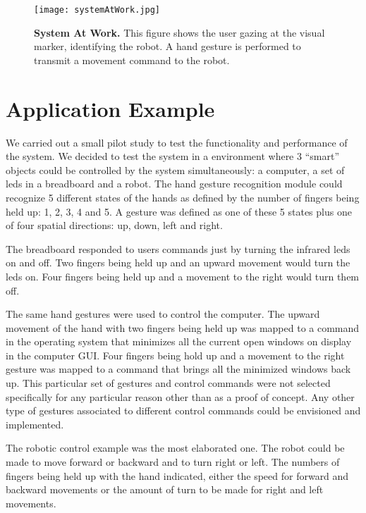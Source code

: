\documentclass[jou,a4paper,notxfonts]{apa}
\begin{document}
\begin{figure}[tp]
 \texttt{[image: systemAtWork.jpg]}
 \caption{\textbf{System At Work.} This figure shows the user gazing at the visual marker, identifying the robot. A hand gesture is performed to transmit a movement command to the robot.}
 \label{systemAtWork}
\end{figure}

\section{Application Example}
We carried out a small pilot study to test the functionality and performance of the system. We decided to test the
system in a environment where 3 ``smart'' objects could be controlled by the system simultaneously: a computer, a set of
leds in a breadboard and a robot. The hand gesture recognition module could recognize 5 different states of the hands
as defined by the number of fingers being held up: 1, 2, 3, 4 and 5. A gesture was defined as one of these 5 states plus
one of four spatial directions: up, down, left and right.

The breadboard responded to users commands just by turning the infrared leds on and off. Two fingers being held up and
an upward movement would turn the leds on. Four fingers being held up and a movement to the right would turn them off.

The same hand gestures were used to control the computer. The upward movement of the hand with two fingers being held up
was mapped to a command in the operating system that minimizes all the current open windows on display in the computer
GUI. Four fingers being hold up and a movement to the right gesture was mapped to a command that brings all the
minimized windows back up. This particular set of gestures and control commands were not selected specifically for
any particular reason other than as a proof of concept. Any other type of gestures associated to different
control commands could be envisioned and implemented.

The robotic control example was the most elaborated one. The robot could be made to move forward or backward and to turn right or
left. The numbers of fingers being held up with the hand indicated, either the speed for forward and backward movements
or the amount of turn to be made for right and left movements.
\end{document}

